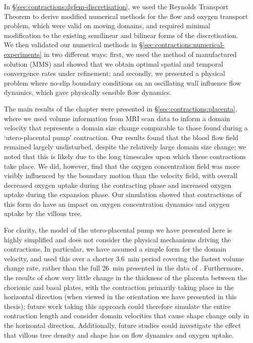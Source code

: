         In \S\ref{sec:contractions:dgfem-discretisation}, we used the Reynolds Transport Theorem to derive modified numerical methods for the flow and oxygen transport problem, which were valid on moving domains, and required minimal modification to the existing semilinear and bilinear forms of the discretisation. We then validated our numerical methods in \S\ref{sec:contractions:numerical-experiments} in two different ways: first, we used the method of manufactured solution (MMS) and showed that we obtain optimal spatial and temporal convergence rates under refinement; and secondly, we presented a physical problem where no-slip boundary conditions on an oscillating wall influence flow dynamics, which gave physically sensible flow dynamics.

        The main results of the chapter were presented in \S\ref{sec:contractions:placenta}, where we used volume information from MRI scan data to inform a domain velocity that represents a domain size change comparable to those found during a `utero-placental pump' contraction. Our results found that the blood flow field remained largely undisturbed, despite the relatively large domain size change; we noted that this is likely due to the long timescales upon which these contractions take place. We did, however, find that the oxygen concentration field was more visibly influenced by the boundary motion than the velocity field, with overall decreased oxygen uptake during the contracting phase and increased oxygen uptake during the expansion phase. Our simulation showed that contractions of this form do have an impact on oxygen concentration dynamics and oxygen uptake by the villous tree.

        For clarity, the model of the utero-placental pump we have presented here is highly simplified and does not consider the physical mechanisms driving the contractions. In particular, we have assumed a simple form for the domain velocity, and used this over a shorter \qty{3.6}{\minute} period covering the fastest volume change rate, rather than the full \qty{26}{\minute} presented in the data of \citeauthor{gowlandCharacterisingPlacentalContractions2024} \cite{gowlandCharacterisingPlacentalContractions2024}. Furthermore, the results of \citeauthor{dellschaftHaemodynamicsHumanPlacenta2020} \cite{dellschaftHaemodynamicsHumanPlacenta2020} show very little change in the thickness of the placenta between the chorionic and basal plates, with the contraction primarily taking place in the horizontal direction (when viewed in the orientation we have presented in this thesis); future work taking this approach could therefore simulate the entire contraction length and consider domain velocities that cause shape change only in the horizontal direction. Additionally, future studies could investigate the effect that villous tree density and shape has on flow dynamics and oxygen uptake.

